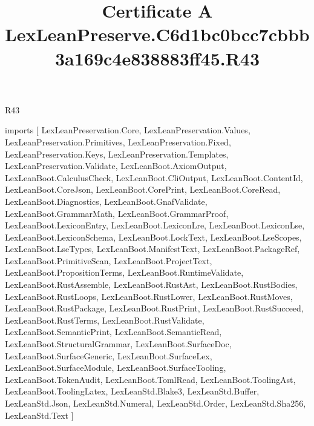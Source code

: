\begin{lexlean}{R43}
\title{Certificate A LexLeanPreserve.C6d1bc0bcc7cbbb3a169c4e838883ff45.R43}
\begin{coremodule}
imports [
  LexLeanPreservation.Core,
  LexLeanPreservation.Values,
  LexLeanPreservation.Primitives,
  LexLeanPreservation.Fixed,
  LexLeanPreservation.Keys,
  LexLeanPreservation.Templates,
  LexLeanPreservation.Validate,
  LexLeanBoot.AxiomOutput,
  LexLeanBoot.CalculusCheck,
  LexLeanBoot.CliOutput,
  LexLeanBoot.ContentId,
  LexLeanBoot.CoreJson,
  LexLeanBoot.CorePrint,
  LexLeanBoot.CoreRead,
  LexLeanBoot.Diagnostics,
  LexLeanBoot.GnafValidate,
  LexLeanBoot.GrammarMath,
  LexLeanBoot.GrammarProof,
  LexLeanBoot.LexiconEntry,
  LexLeanBoot.LexiconLre,
  LexLeanBoot.LexiconLse,
  LexLeanBoot.LexiconSchema,
  LexLeanBoot.LockText,
  LexLeanBoot.LseScopes,
  LexLeanBoot.LseTypes,
  LexLeanBoot.ManifestText,
  LexLeanBoot.PackageRef,
  LexLeanBoot.PrimitiveScan,
  LexLeanBoot.ProjectText,
  LexLeanBoot.PropositionTerms,
  LexLeanBoot.RuntimeValidate,
  LexLeanBoot.RustAssemble,
  LexLeanBoot.RustAst,
  LexLeanBoot.RustBodies,
  LexLeanBoot.RustLoops,
  LexLeanBoot.RustLower,
  LexLeanBoot.RustMoves,
  LexLeanBoot.RustPackage,
  LexLeanBoot.RustPrint,
  LexLeanBoot.RustSucceed,
  LexLeanBoot.RustTerms,
  LexLeanBoot.RustValidate,
  LexLeanBoot.SemanticPrint,
  LexLeanBoot.SemanticRead,
  LexLeanBoot.StructuralGrammar,
  LexLeanBoot.SurfaceDoc,
  LexLeanBoot.SurfaceGeneric,
  LexLeanBoot.SurfaceLex,
  LexLeanBoot.SurfaceModule,
  LexLeanBoot.SurfaceTooling,
  LexLeanBoot.TokenAudit,
  LexLeanBoot.TomlRead,
  LexLeanBoot.ToolingAst,
  LexLeanBoot.ToolingLatex,
  LexLeanStd.Blake3,
  LexLeanStd.Buffer,
  LexLeanStd.Json,
  LexLeanStd.Numeral,
  LexLeanStd.Order,
  LexLeanStd.Sha256,
  LexLeanStd.Text
]


\end{coremodule}
\end{lexlean}
